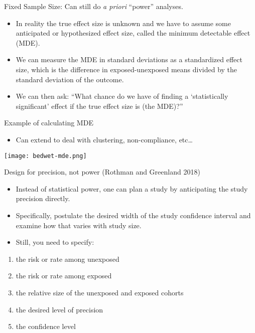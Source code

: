 \documentclass[ignorenonframetext,]{beamer}
\providecommand{\tightlist}{%
  \setlength{\itemsep}{0pt}\setlength{\parskip}{0pt}}
\begin{document}
\begin{frame}{Fixed Sample Size: Can still do \emph{a priori} ``power''
analyses.}
\protect\hypertarget{fixed-sample-size-can-still-do-a-priori-power-analyses.}{}

\begin{itemize}
\item
  In reality the true effect size is unknown and we have to assume some
  anticipated or hypothesized effect size, called the minimum detectable
  effect (MDE).
\item
  We can measure the MDE in standard deviations as a standardized effect
  size, which is the difference in exposed-unexposed means divided by
  the standard deviation of the outcome.
\item
  We can then ask: ``What chance do we have of finding a `statistically
  significant' effect if the true effect size is (the MDE)?''
\end{itemize}

\end{frame}

\begin{frame}{Example of calculating MDE}
\protect\hypertarget{example-of-calculating-mde}{}

\begin{itemize}
\tightlist
\item
  Can extend to deal with clustering, non-compliance, etc\ldots{}
\end{itemize}

\texttt{[image: bedwet-mde.png]}

\end{frame}

\begin{frame}{Design for precision, not power (Rothman and Greenland
2018)}
\protect\hypertarget{design-for-precision-not-power-rothman2018sf}{}

\begin{itemize}
\tightlist
\item
  Instead of statistical power, one can plan a study by anticipating the
  study precision directly.
\item
  Specifically, postulate the desired width of the study confidence
  interval and examine how that varies with study size.
\item
  Still, you need to specify:
\end{itemize}

\begin{enumerate}
[1)]
\tightlist
\item
  the risk or rate among unexposed
\item
  the risk or rate among exposed
\item
  the relative size of the unexposed and exposed cohorts
\item
  the desired level of precision
\item
  the confidence level
\end{enumerate}

\end{frame}
\end{document}
